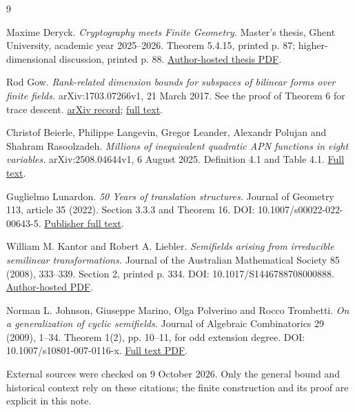 \documentclass[11pt,a4paper]{article}
\theoremstyle{definition}
\begin{document}
\begin{thebibliography}{9}

Maxime Deryck. \emph{Cryptography meets Finite Geometry.} Master's thesis, Ghent University, academic year 2025--2026. Theorem 5.4.15, printed p. 87; higher-dimensional discussion, printed p. 88. \href{https://maximederyck.be/assets/Cryptography\%20meets\%20Finite\%20Geometry.pdf}{Author-hosted thesis PDF}.

Rod Gow. \emph{Rank-related dimension bounds for subspaces of bilinear forms over finite fields.} arXiv:1703.07266v1, 21 March 2017. See the proof of Theorem 6 for trace descent. \href{https://arxiv.org/abs/1703.07266}{arXiv record}; \href{https://arxiv.org/html/1703.07266}{full text}.

Christof Beierle, Philippe Langevin, Gregor Leander, Alexandr Polujan and Shahram Rasoolzadeh. \emph{Millions of inequivalent quadratic APN functions in eight variables.} arXiv:2508.04644v1, 6 August 2025. Definition 4.1 and Table 4.1. \href{https://arxiv.org/html/2508.04644v1}{Full text}.

Guglielmo Lunardon. \emph{50 Years of translation structures.} Journal of Geometry 113, article 35 (2022). Section 3.3.3 and Theorem 16. DOI: 10.1007/s00022-022-00643-5. \href{https://link.springer.com/article/10.1007/s00022-022-00643-5}{Publisher full text}.

William M. Kantor and Robert A. Liebler. \emph{Semifields arising from irreducible semilinear transformations.} Journal of the Australian Mathematical Society 85 (2008), 333--339. Section 2, printed p. 334. DOI: 10.1017/S1446788708000888. \href{https://pages.uoregon.edu/kantor/PAPERS/IrreducibleSemilinear.pdf}{Author-hosted PDF}.

Norman L. Johnson, Giuseppe Marino, Olga Polverino and Rocco Trombetti. \emph{On a generalization of cyclic semifields.} Journal of Algebraic Combinatorics 29 (2009), 1--34. Theorem 1(2), pp. 10--11, for odd extension degree. DOI: 10.1007/s10801-007-0116-x. \href{https://emis.de/ft/43764}{Full text PDF}.

\end{thebibliography}
External sources were checked on $9$ October $2026$. Only the general bound and historical context rely on these citations; the finite construction and its proof are explicit in this note.
\end{document}
